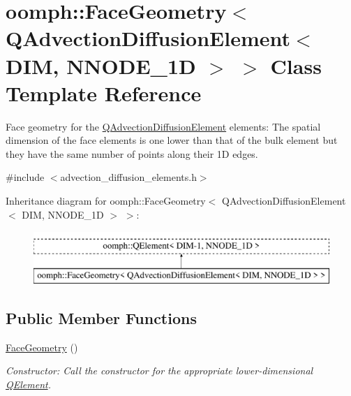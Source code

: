 \hypertarget{classoomph_1_1FaceGeometry_3_01QAdvectionDiffusionElement_3_01DIM_00_01NNODE__1D_01_4_01_4}{}\section{oomph\+:\+:Face\+Geometry$<$ Q\+Advection\+Diffusion\+Element$<$ D\+IM, N\+N\+O\+D\+E\+\_\+1D $>$ $>$ Class Template Reference}
\label{classoomph_1_1FaceGeometry_3_01QAdvectionDiffusionElement_3_01DIM_00_01NNODE__1D_01_4_01_4}


Face geometry for the \hyperlink{classoomph_1_1QAdvectionDiffusionElement}{Q\+Advection\+Diffusion\+Element} elements\+: The spatial dimension of the face elements is one lower than that of the bulk element but they have the same number of points along their 1D edges.  




{\ttfamily \#include $<$advection\+\_\+diffusion\+\_\+elements.\+h$>$}

Inheritance diagram for oomph\+:\+:Face\+Geometry$<$ Q\+Advection\+Diffusion\+Element$<$ D\+IM, N\+N\+O\+D\+E\+\_\+1D $>$ $>$\+:\begin{figure}[H]
\begin{center}
\leavevmode
\includegraphics[height=2.000000cm]{classoomph_1_1FaceGeometry_3_01QAdvectionDiffusionElement_3_01DIM_00_01NNODE__1D_01_4_01_4}
\end{center}
\end{figure}
\subsection*{Public Member Functions}
\begin{DoxyCompactItemize}
\item 
\hyperlink{classoomph_1_1FaceGeometry_3_01QAdvectionDiffusionElement_3_01DIM_00_01NNODE__1D_01_4_01_4_a89cd6c140e9280133ee246a1dc64a4cc}{Face\+Geometry} ()
\begin{DoxyCompactList}\small\item\em Constructor\+: Call the constructor for the appropriate lower-\/dimensional \hyperlink{classoomph_1_1QElement}{Q\+Element}. \end{DoxyCompactList}\end{DoxyCompactItemize}



